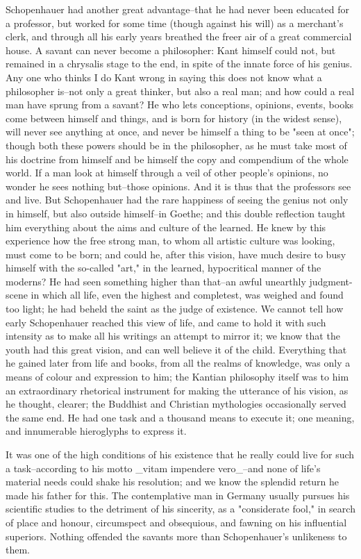 Schopenhauer had another great advantage--that he had never been
educated for a professor, but worked for some time (though against
his will) as a merchant's clerk, and through all his early years
breathed the freer air of a great commercial house. A savant can
never become a philosopher: Kant himself could not, but remained in a
chrysalis stage to the end, in spite of the innate force of his
genius. Any one who thinks I do Kant wrong in saying this does not
know what a philosopher is--not only a great thinker, but also a real
man; and how could a real man have sprung from a savant? He who lets
conceptions, opinions, events, books come between himself and things,
and is born for history (in the widest sense), will never see
anything at once, and never be himself a thing to be "seen at once";
though both these powers should be in the philosopher, as he must
take most of his doctrine from himself and be himself the copy and
compendium of the whole world. If a man look at himself through a
veil of other people's opinions, no wonder he sees nothing but--those
opinions. And it is thus that the professors see and live. But
Schopenhauer had the rare happiness of seeing the genius not only in
himself, but also outside himself--in Goethe; and this double
reflection taught him everything about the aims and culture of the
learned. He knew by this experience how the free strong man, to whom
all artistic culture was looking, must come to be born; and could he,
after this vision, have much desire to busy himself with the
so-called "art," in the learned, hypocritical manner of the moderns?
He had seen something higher than that--an awful unearthly
judgment-scene in which all life, even the highest and completest,
was weighed and found too light; he had beheld the saint as the judge
of existence. We cannot tell how early Schopenhauer reached this view
of life, and came to hold it with such intensity as to make all his
writings an attempt to mirror it; we know that the youth had this
great vision, and can well believe it of the child. Everything that
he gained later from life and books, from all the realms of
knowledge, was only a means of colour and expression to him; the
Kantian philosophy itself was to him an extraordinary rhetorical
instrument for making the utterance of his vision, as he thought,
clearer; the Buddhist and Christian mythologies occasionally served
the same end. He had one task and a thousand means to execute it; one
meaning, and innumerable hieroglyphs to express it.

It was one of the high conditions of his existence that he really
could live for such a task--according to his motto _vitam impendere
vero_--and none of life's material needs could shake his resolution;
and we know the splendid return he made his father for this. The
contemplative man in Germany usually pursues his scientific studies
to the detriment of his sincerity, as a "considerate fool," in search
of place and honour, circumspect and obsequious, and fawning on his
influential superiors. Nothing offended the savants more than
Schopenhauer's unlikeness to them.



